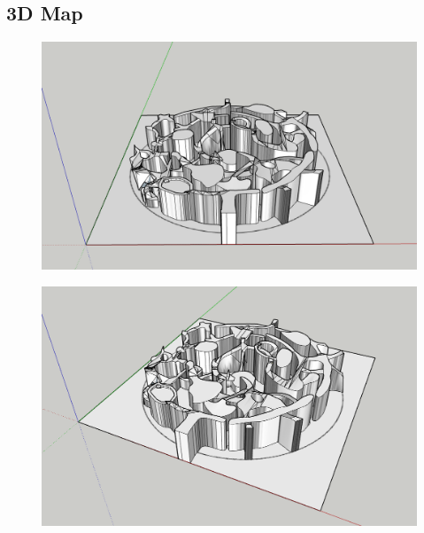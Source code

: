 \subsection{3D Map}

\begin{figure}[H]
	\centering
	\includegraphics[width=14cm]{images/map/3D_map_001.png}
\end{figure}
\vspace*{3cm}
\begin{figure}[H]
	\centering
	\includegraphics[width=14cm]{images/map/3D_map_002.png}
\end{figure}

